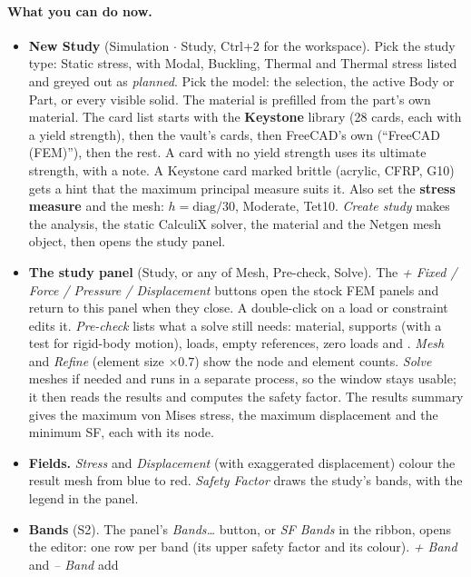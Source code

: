 \paragraph{What you can do now.}
\begin{itemize}[nosep]
  \item \textbf{New Study} (Simulation $\cdot$ Study, Ctrl+2 for the workspace). Pick the study type: Static stress,
        with Modal, Buckling, Thermal and Thermal stress listed and greyed out as \emph{planned}. Pick the model:
        the selection, the active Body or Part, or every visible solid. The material is prefilled from the part's
        own material. The card list starts with the \textbf{Keystone} library (28 cards, each with a yield
        strength), then the vault's cards, then FreeCAD's own (``FreeCAD (FEM)''), then the rest. A card with
        no yield strength uses its ultimate strength, with a note. A Keystone card marked brittle (acrylic,
        CFRP, G10) gets a hint that the maximum principal measure suits it. Also set the \textbf{stress measure}
        and the mesh: $h=\text{diag}/30$, Moderate, Tet10. \emph{Create study} makes the analysis, the static
        CalculiX solver, the material and the Netgen mesh object, then opens the study panel.
  \item \textbf{The study panel} (Study, or any of Mesh, Pre-check, Solve). The \emph{+ Fixed / Force /
        Pressure / Displacement} buttons open the stock FEM panels and return to this panel when they close.
        A double-click on a load or constraint edits it. \emph{Pre-check} lists what a solve still needs:
        material, supports (with a test for rigid-body motion), loads, empty references, zero loads and
        . \emph{Mesh} and \emph{Refine} (element size $\times0.7$) show the node and element counts.
        \emph{Solve} meshes if needed and runs  in a separate process, so the window stays usable;
        it then reads the results and computes the safety factor. The results summary gives the maximum von
        Mises stress, the maximum displacement and the minimum SF, each with its node.
  \item \textbf{Fields.} \emph{Stress} and \emph{Displacement} (with exaggerated displacement) colour the result
        mesh from blue to red. \emph{Safety Factor} draws the study's bands, with the legend in the panel.
  \item \textbf{Bands} (S2). The panel's \emph{Bands\dots} button, or \emph{SF Bands} in the ribbon, opens the
        editor: one row per band (its upper safety factor and its colour). \emph{+ Band} and \emph{-- Band} add

\end{itemize}
